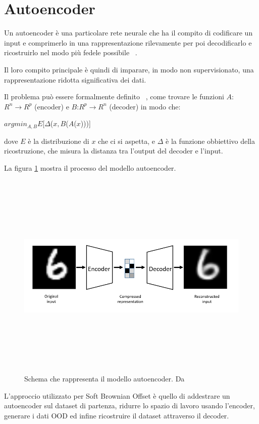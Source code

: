 \section{Autoencoder} 

Un autoencoder è una particolare rete neurale che ha il compito di codificare un input e comprimerlo in una rappresentazione rilevamente per poi decodificarlo e ricostruirlo nel modo più fedele possibile ~\cite{bankAutoencoders2021}.

Il loro compito principale è quindi di imparare, in modo non supervisionato, una rappresentazione ridotta significativa dei dati.

Il problema può essere formalmente definito ~\cite{baldiAutoencodersUnsupervisedLearning}, come trovare le funzioni $A$:$ R^{n} \rightarrow R^p$ (encoder) e $B$:$ R^{p} \rightarrow R^n$ (decoder) in modo che:

\begin{center}
$arg min_{A,B} E$[$\Delta$($x,  B$($A$($x$)))] \\
\end{center}

dove $E$ è la distribuzione di $x$ che ci si aspetta, e $\Delta$ è la funzione obbiettivo della ricostruzione, che misura la distanza tra l'output del decoder e l'input.

La figura \ref{fig:ae_schema} mostra il processo del modello autoencoder.

\begin{figure}[htpb]
    \centering
    \includegraphics[width=\textwidth,height=10cm,keepaspectratio=true]{img/ae_schema.png}
    \caption{
        Schema che rappresenta il modello autoencoder. Da ~\cite{baldiAutoencodersUnsupervisedLearning}
    }
    \label{fig:ae_schema}
\end{figure}


L'approccio utilizzato per Soft Brownian Offset è quello di addestrare un autoencoder sul dataset di partenza, ridurre lo spazio di lavoro usando l'encoder, generare i dati OOD ed infine ricostruire il dataset attraverso il decoder.



